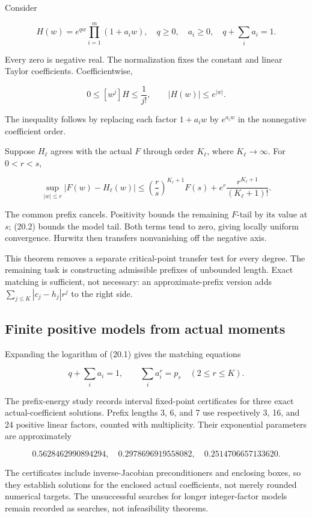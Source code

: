 \documentclass[
  10pt,
  a4paper,
  10pt,
  oneside,
  openany]{book}
\begin{document}
Consider

\[
H(w)=e^{qw}\prod_{i=1}^{m}(1+a_iw),
\quad q\ge0,\quad a_i\ge0,
\quad q+\sum_i a_i=1.
\tag{20.1}\label{eq:20.1}
\]

Every zero is negative real. The normalization fixes the constant and
linear Taylor coefficients. Coefficientwise,

\[
0\le[w^j]H\le\frac1{j!},
\qquad |H(w)|\le e^{|w|}.
\tag{20.2}\label{eq:20.2}
\]

The inequality follows by replacing each factor \(1+a_iw\) by
\(e^{a_iw}\) in the nonnegative coefficient order.

Suppose \(H_\ell\) agrees with the actual \(F\) through order
\(K_\ell\), where \(K_\ell\to\infty\). For \(0<r<s\),

\[
\sup_{|w|\le r}|F(w)-H_\ell(w)|
\le\left(\frac rs\right)^{K_\ell+1}F(s)
+e^r\frac{r^{K_\ell+1}}{(K_\ell+1)!}.
\tag{20.3}\label{eq:20.3}
\]

The common prefix cancels. Positivity bounds the remaining \(F\)-tail by
its value at \(s\); (20.2) bounds the model tail. Both terms tend to
zero, giving locally uniform convergence. Hurwitz then transfers
nonvanishing off the negative axis.

This theorem removes a separate critical-point transfer test for every
degree. The remaining task is constructing admissible prefixes of
unbounded length. Exact matching is sufficient, not necessary: an
approximate-prefix version adds \(\sum_{j\le K}|c_j-h_j|r^j\) to the
right side.

\subsection{Finite positive models from actual
moments}\label{finite-positive-models-from-actual-moments}

Expanding the logarithm of (20.1) gives the matching equations

\[
q+\sum_i a_i=1,
\qquad\sum_i a_i^r=p_r\quad(2\le r\le K).
\tag{20.4}\label{eq:20.4}
\]

The prefix-energy study records interval fixed-point certificates for
three exact actual-coefficient solutions. Prefix lengths 3, 6, and 7 use
respectively 3, 16, and 24 positive linear factors, counted with
multiplicity. Their exponential parameters are approximately

\[
0.5628462990894294,
\quad0.2978696919558082,
\quad0.2514706657133620.
\tag{20.5}\label{eq:20.5}
\]

The certificates include inverse-Jacobian preconditioners and enclosing
boxes, so they establish solutions for the enclosed actual coefficients,
not merely rounded numerical targets. The unsuccessful searches for
longer integer-factor models remain recorded as searches, not
infeasibility theorems.
\end{document}
